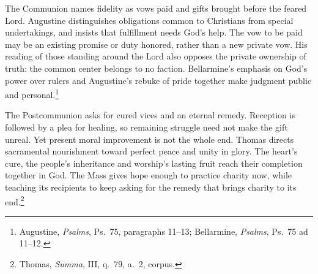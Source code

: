 The Communion names fidelity as vows paid and gifts brought before the feared Lord. Augustine distinguishes obligations common to Christians from special undertakings, and insists that fulfillment needs God's help. The vow to be paid may be an existing promise or duty honored, rather than a new private vow. His reading of those standing around the Lord also opposes the private ownership of truth: the common center belongs to no faction. Bellarmine's emphasis on God's power over rulers and Augustine's rebuke of pride together make judgment public and personal.\footnote{Augustine, \textit{Psalms}, Ps.~75, paragraphs 11--13; Bellarmine, \textit{Psalms}, Ps.~75 ad 11--12.}

The Postcommunion asks for cured vices and an eternal remedy. Reception is followed by a plea for healing, so remaining struggle need not make the gift unreal. Yet present moral improvement is not the whole end. Thomas directs sacramental nourishment toward perfect peace and unity in glory. The heart's cure, the people's inheritance and worship's lasting fruit reach their completion together in God. The Mass gives hope enough to practice charity now, while teaching its recipients to keep asking for the remedy that brings charity to its end.\footnote{Thomas, \textit{Summa}, III, q.~79, a.~2, corpus.}
